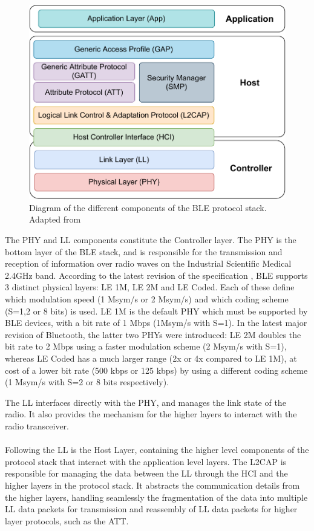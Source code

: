 \begin{figure}[H]
    \centering
    \includegraphics[width=0.6\linewidth]{images/ble protocol stack.pdf}
    \caption[Diagram of the different components of the \acs{BLE} protocol stack.]{Diagram of the different components of the \acs{BLE} protocol stack. Adapted from \cite{Specification1999, Farej2020}}
    \label{fig:ble-protocol-stack}
\end{figure}

The \acf{PHY} and \acf{LL} components constitute the Controller layer. The \acs{PHY} is the bottom layer of the \acs{BLE} stack, and is responsible for the transmission and reception of information over radio waves on the Industrial Scientific Medical 2.4GHz band. According to the latest revision of the specification \cite{Specification1999}, \acs{BLE} supports 3 distinct physical layers: LE 1M, LE 2M and LE Coded. Each of these define which modulation speed (1 Msym/s or 2 Msym/s) and which coding scheme (S=1,2 or 8 bits) is used. LE 1M is the default \acs{PHY} which must be supported by \acs{BLE} devices, with a bit rate of 1 Mbps (1Msym/s with S=1). In the latest major revision of Bluetooth, the latter two \acs{PHY}s were introduced: LE 2M doubles the bit rate to 2 Mbps using a faster modulation scheme (2 Msym/s with S=1), whereas LE Coded has a much larger range (2x or 4x compared to LE 1M), at cost of a lower bit rate (500 kbps or 125 kbps) by using a different coding scheme (1 Msym/s with S=2 or 8 bits respectively). 

The \acf{LL} interfaces directly with the \acs{PHY}, and manages the link state of the radio. It also provides the mechanism for the higher layers to interact with the radio transceiver. 

\paragraph{} Following the \acf{LL} is the Host Layer, containing the higher level components of the protocol stack that interact with the application level layers. The \acs{L2CAP} is responsible for managing the data between the \acs{LL} through the \acf{HCI} and the higher layers in the protocol stack. It abstracts the communication details from the higher layers, handling seamlessly the fragmentation of the data into multiple \acs{LL} data packets for transmission and reassembly of \acs{LL} data packets for higher layer protocols, such as the \acf{ATT}.

